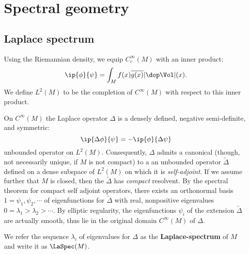 \section{Spectral geometry}
\subsection{Laplace spectrum}
Using the Riemannian density, we equip $C^\infty_c(M)$ with an inner product:
\[ \ip{\phi}{\psi} = \int_M f(x) \overline{g(x)} |\dop \Vol|(x). \]
We define $L^2(M)$ to be the completion of $C^\infty(M)$ with respect to this inner product.

On $C^\infty(M)$ the Laplace operator $\Delta$ is a densely defined, negative semi-definite, and symmetric:
\[ \ip{\Delta \phi}{\psi} = - \ip{\phi}{\Delta \psi} \]
unbounded operator on $L^2(M)$. Consequently, $\Delta$ admits a canonical (though, not necessarily unique, if $M$ is not compact) to a an unbounded operator $\tilde{\Delta}$ defined on a dense subspace of $L^2(M)$ on which it is \textit{self-adjoint}. If we assume further that $M$ is closed, then the $\tilde{\Delta}$ has \textit{compact} resolvent. By the spectral theorem for compact self adjoint operators, there exists an orthonormal basis $1=\psi_1,\psi_2,\cdots$ of eigenfunctions for $\tilde{\Delta}$ with real, nonpositive eigenvalues $0=\lambda_1>\lambda_2>\cdots$. By elliptic regularity, the eigenfunctions $\psi_i$ of the extension $\tilde{\Delta}$ are actually smooth, thus lie in the original domain $C^\infty(M)$ of $\Delta$.

We refer the sequence $\lambda_i$ of eigenvalues for $\Delta$ as the \textbf{Laplace-spectrum} of $M$ and write it as $\LaSpec(M)$.

